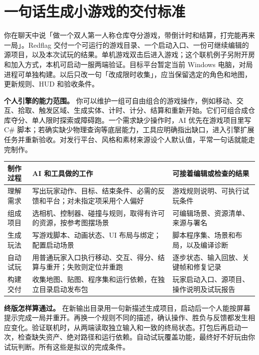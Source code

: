 \documentclass[UTF8,11pt,fontset=fandol,a4paper]{ctexart}
\begin{document}
\section{一句话生成小游戏的交付标准}
你在聊天中说「做一个双人第一人称仓库夺分游戏，带倒计时和结算，打完能再来一局」。Redflag 交付一个可运行的游戏目录、一个启动入口、一份可继续编辑的源项目，以及本次试玩的结果。单机游戏双击后进入游戏；这个联机例子另附开房和加入方式，本机可启动一服两端验证。目标平台暂定当前 Windows 电脑，对局进程可单独构建。以后只改一句「改成限时收集」，应当保留选定的角色和地图，更新规则、HUD 和验收条件。

\textbf{个人引擎的能力范围。} 你可以维护一组可自由组合的游戏操作，例如移动、交互、拾取、触发区域、生成实体、计时、计分、结算和重新开始。它们可组合成仓库夺分、单人限时探索或障碍跑。一个需求缺少操作时，AI 优先在游戏项目里写 C\# 脚本；若确实缺少物理查询等底层能力，工具应明确指出缺口，进入引擎扩展任务并重新验收。对发行平台、风格和素材来源设个人默认值，平常一句话就能走完制作。

\begin{center}\small
\begin{tabularx}{\linewidth}{@{}p{30mm}XX@{}}\toprule
制作过程 & AI 和工具做的工作 & 可接着编辑或检查的结果\\\midrule
理解需求 & 写出玩家动作、目标、结束条件、必需的反馈和平台；对未指定项采用个人偏好 & 游戏规则说明、可执行试玩条件\\
组成项目 & 选相机、控制器、碰撞与规则，取得有许可的资源，按参考图摆场景 & 可编辑场景、资源清单、来源与署名\\
生成玩法 & 写游戏脚本、动画状态、UI 布局与绑定；配置启动场景 & 脚本程序集、场景和布局，以及编译诊断\\
自动试玩 & 用普通玩家入口执行移动、交互、得分、结算与重开；失败则定位并重跑 & 逐步状态、输入回放、关键帧和修复记录\\
构建交付 & 收集地图、贴图、程序集和运行依赖，在独立目录启动发布包 & 玩家启动入口、源项目、操作说明及试玩报告\\
\bottomrule\end{tabularx}\end{center}

\textbf{终版怎样算通过。} 在新输出目录用一句新描述生成项目，启动后一个人能按屏幕提示完成一局并重开。再换一个规则不同的描述，确认操作、胜负与反馈都发生相应变化。验证联机时，从两端读取独立输入和一致的终局状态。打包后再启动一次，检查缺失资产、绝对路径和运行依赖。自动试玩覆盖功能，最终好不好玩由你试玩判断。所有这些是拟议的完成条件。

\clearpage
\end{document}
